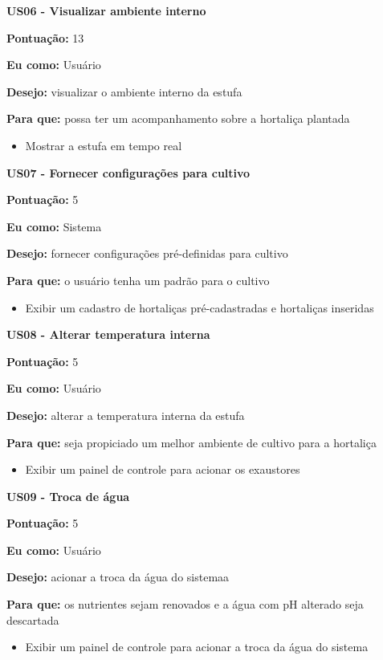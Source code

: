 \textbf{US06 - Visualizar ambiente interno}

\textbf{Pontuação:} 13

\textbf{Eu como:} Usuário

\textbf{Desejo:} visualizar o ambiente interno da estufa

\textbf{Para que:} possa ter um acompanhamento sobre a hortaliça plantada

\begin{itemize}
	\item Mostrar a estufa em tempo real
\end{itemize}

\textbf{US07 - Fornecer configurações para cultivo}

\textbf{Pontuação:} 5

\textbf{Eu como:} Sistema

\textbf{Desejo:} fornecer configurações pré-definidas para cultivo

\textbf{Para que:} o usuário tenha um padrão para o cultivo

\begin{itemize}
	\item Exibir um cadastro de hortaliças pré-cadastradas e hortaliças inseridas
\end{itemize}

\textbf{US08 - Alterar temperatura interna}

\textbf{Pontuação:} 5

\textbf{Eu como:} Usuário

\textbf{Desejo:} alterar a temperatura interna da estufa

\textbf{Para que:} seja propiciado um melhor ambiente de cultivo para a hortaliça

\begin{itemize}
	\item Exibir um painel de controle para acionar os exaustores
\end{itemize}

\textbf{US09 - Troca de água}

\textbf{Pontuação:} 5

\textbf{Eu como:} Usuário

\textbf{Desejo:} acionar a troca da água do sistemaa

\textbf{Para que:} os nutrientes sejam renovados e a água com pH alterado seja descartada

\begin{itemize}
	\item Exibir um painel de controle para acionar a troca da água do sistema

\end{itemize}

